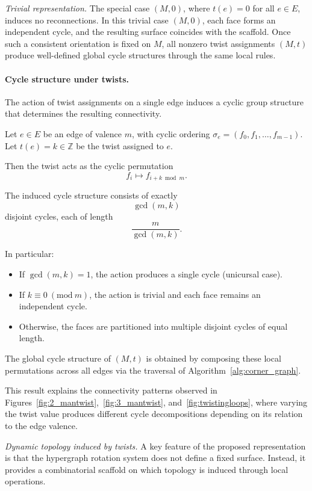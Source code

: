 \documentclass[acmtog,anonymous,review]{acmart}
\begin{document}
\textit{Trivial representation.}
The special case $(M, 0)$, where $t(e) = 0$ for all $e \in E$, induces no reconnections. In this trivial case $(M,0)$, each face forms an independent cycle, and the resulting surface coincides with the scaffold.  Once such a consistent orientation is fixed on $M$, all nonzero twist assignments $(M,t)$ produce well-defined global cycle structures through
the same local rules.

\paragraph{Cycle structure under twists.}

The action of twist assignments on a single edge induces a cyclic
group structure that determines the resulting connectivity.

\begin{theorem}
\label{theo:twist}
Let $e \in E$ be an edge of valence $m$, with cyclic ordering
$\sigma_e = (f_0, f_1, \ldots, f_{m-1})$. Let $t(e) = k \in \mathbb{Z}$
be the twist assigned to $e$.

Then the twist acts as the cyclic permutation
\[
f_i \mapsto f_{i+k \bmod m}.
\]

The induced cycle structure consists of exactly
\[
\gcd(m, k)
\]
disjoint cycles, each of length
\[
\frac{m}{\gcd(m, k)}.
\]

In particular:
\begin{itemize}
\item If $\gcd(m, k) = 1$, the action produces a single cycle
(unicursal case).
\item If $k \equiv 0 \ (\mathrm{mod}\ m)$, the action is trivial and
each face remains an independent cycle.
\item Otherwise, the faces are partitioned into multiple disjoint
cycles of equal length.
\end{itemize}
The global cycle structure of $(M,t)$ is obtained by composing these local permutations across all edges via the traversal of Algorithm~\ref{alg:corner_graph}.
\end{theorem}

This result explains the connectivity patterns observed in Figures~\ref{fig:2_mantwist},~\ref{fig:3_mantwist}, and~\ref{fig:twistingloops}, where varying the twist value produces different cycle decompositions depending on its relation to the edge valence.

\textit{Dynamic topology induced by twists.}
A key feature of the proposed representation is that the hypergraph rotation system does not define a fixed surface. Instead, it provides
a combinatorial scaffold on which topology is induced through local operations.
\end{document}
